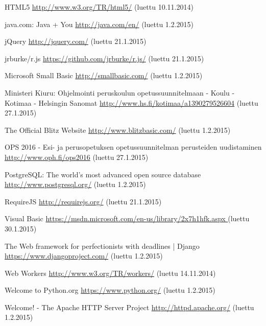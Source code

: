 \begin{thebibliography}{99}
	HTML5 \url{http://www.w3.org/TR/html5/} (luettu 10.11.2014)
	
	java.com: Java + You \url{http://java.com/en/} (luettu 1.2.2015)
	
	jQuery \url{http://jquery.com/} (luettu 21.1.2015)
	
	jrburke/r.js \url{https://github.com/jrburke/r.js/} (luettu 21.1.2015)
	
	Microsoft Small Basic \url{http://smallbasic.com/} (luettu 1.2.2015)
	
	Ministeri Kiuru: Ohjelmointi peruskoulun opetussuunnitelmaan - Koulu - Kotimaa - Helsingin Sanomat \url{http://www.hs.fi/kotimaa/a1390279526604} (luettu 27.1.2015)
	
	The Official Blitz Website \url{http://www.blitzbasic.com/} (luettu 1.2.2015)
	
	OPS 2016 - Esi- ja perusopetuksen opetussuunnitelman perusteiden uudistaminen \url{http://www.oph.fi/ops2016} (luettu 27.1.2015)
	
	PostgreSQL: The world's most advanced open source database \url{http://www.postgresql.org/} (luettu 1.2.2015)

	RequireJS \url{http://requirejs.org/} (luettu 21.1.2015)

	Visual Basic \url{https://msdn.microsoft.com/en-us/library/2x7h1hfk.aspx
} (luettu 30.1.2015)

	The Web framework for perfectionists with deadlines | Django \url{https://www.djangoproject.com/} (luettu 1.2.2015)
	
	Web Workers \url{http://www.w3.org/TR/workers/} (luettu 14.11.2014)

	Welcome to Python.org \url{https://www.python.org/} (luettu 1.2.2015)
	
	Welcome! - The Apache HTTP Server Project \url{http://httpd.apache.org/} (luettu 1.2.2015)

\end{thebibliography}
